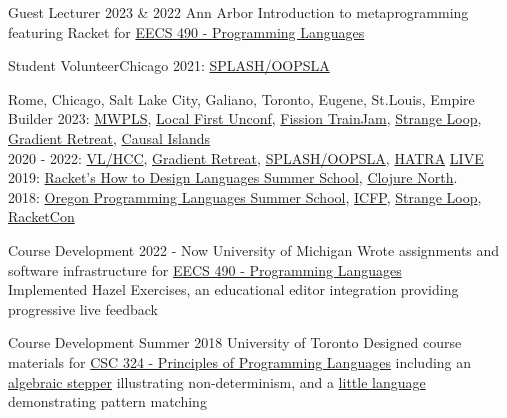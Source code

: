 \documentclass[10pt,a4paper]{article}
\begin{document}
  \headedsubsection
    {Guest Lecturer}
    {2023 \& 2022 \sbull Ann Arbor}
    {Introduction to metaprogramming featuring Racket for \href{https://eecs490.github.io/eecs490.org/}{EECS 490 - Programming Languages}}

  \headedsubsection
    {Student Volunteer}{Chicago}
    {2021: \href{https://2021.splashcon.org/track/splash-2021-oopsla}{SPLASH/OOPSLA}}
    
    {Rome, Chicago, Salt Lake City, Galiano, Toronto, Eugene, St.Louis, Empire Builder}    
    {2023:
    \href{https://mwpls2023.engin.umich.edu/}{MWPLS}, 
    \href{https://lu.ma/localfirstswunconf-stlouis}{Local First Unconf},
    \href{https://talk.fission.codes/t/trainjam-2023/4789}{Fission TrainJam},
    \href{https://www.thestrangeloop.com/}{Strange Loop},
    \href{https://www.gradientretreat.com/}{Gradient Retreat}, 
    \href{https://www.causalislands.com/}{Causal Islands} \\
    2020 - 2022:
    \href{https://conf.researchr.org/home/vlhcc-2022}{VL/HCC},
    \href{https://www.gradientretreat.com/}{Gradient Retreat},
    \href{https://2021.splashcon.org/track/splash-2021-oopsla}{SPLASH/OOPSLA}, 
    \href{https://2021.splashcon.org/home/hatra-2021}{HATRA} 
    \href{https://2021.splashcon.org/home/live-2021}{LIVE} \\
    2019:
    \href{https://school.racket-lang.org/2019/plan/}{Racket's How to Design Languages Summer School},
    \href{https://clojurenorth.com/}{Clojure North}. \\ 
    2018:
    \href{https://www.cs.uoregon.edu/research/summerschool/summer18/}{Oregon Programming Languages Summer School},
    \href{https://conf.researchr.org/home/icfp-2018}{ICFP},
    \href{https://www.thestrangeloop.com/2018/sessions.html}{Strange Loop},
    \href{https://con.racket-lang.org/2018/}{RacketCon}}



  \headedsubsection
    {Course Development}
    {2022 - Now \sbull University of Michigan}
    {Wrote assignments and software infrastructure for \href{https://eecs490.github.io/eecs490.org/}{EECS 490 - Programming Languages} \\
    Implemented Hazel Exercises, an educational editor integration providing progressive live feedback}
    
  \headedsubsection
    {Course Development}
    {Summer 2018 \sbull University of Toronto}
    {Designed course materials for \href{https://www.cs.toronto.edu/~gfb/csc324/2017W/}{CSC 324 - Principles of Programming Languages} including an\\  \href{https://github.com/disconcision/racketlab/blob/master/choice-stepper.rkt}{algebraic stepper} illustrating non-determinism, and a \href{https://github.com/disconcision/ductile}{little language} demonstrating pattern matching}
\end{document}
